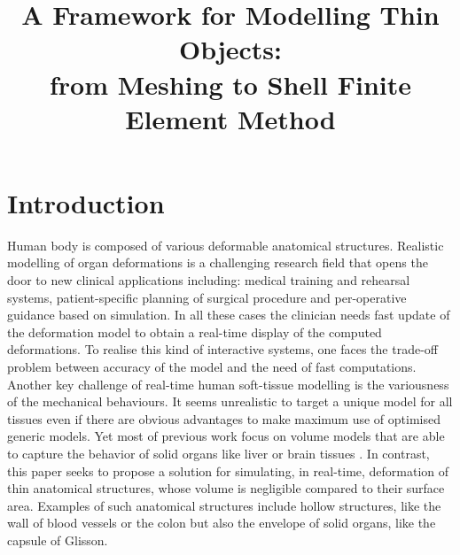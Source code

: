 \documentclass{llncs}
\newcommand{\CD}[1]{{\color{magenta}{\textbf{CD: #1}}}}
\begin{document}
\title{A Framework for Modelling Thin Objects: \\ from Meshing to Shell Finite Element Method}

\maketitle

\begin{abstract}

\end{abstract}

\section{Introduction}

Human body is composed of various deformable anatomical structures. Realistic modelling of organ deformations is a challenging research field that opens the door to new clinical applications including: medical training and rehearsal systems, patient-specific planning of surgical procedure and per-operative guidance based on simulation. In all these cases the clinician needs fast update of the deformation model to obtain a real-time display of the computed deformations. To realise this kind of interactive systems, one faces the trade-off problem between accuracy of the model and the need of fast computations. 
Another key challenge of real-time human soft-tissue modelling is the variousness of the mechanical behaviours. It seems unrealistic to target a unique model for all tissues even if there are obvious advantages to make maximum use of optimised generic models. Yet most of previous work focus on volume models that are able to capture the behavior of solid organs like liver \cite{} or brain tissues \cite{} \CD{TODO: biblio}. In contrast, this paper seeks to propose a solution for simulating, in real-time, deformation of thin anatomical structures, whose volume is negligible compared to their surface area. Examples of such anatomical structures include hollow structures, like the wall of blood vessels or the colon but also the envelope of solid organs, like the capsule of Glisson.
\end{document}

